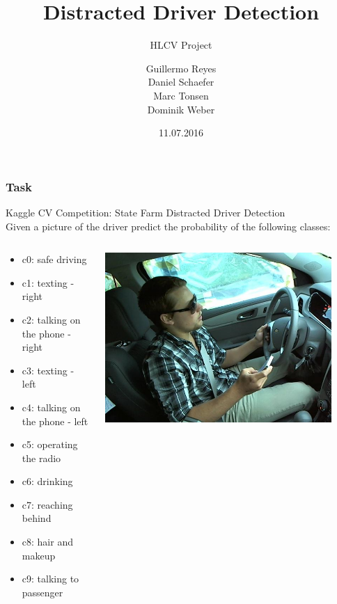 \documentclass{beamer}
\title{Distracted Driver Detection}
\subtitle{HLCV Project}
\author[Reyes, Schaefer, Tonsen, Weber]{Guillermo Reyes \\
	 Daniel Schaefer \\
	 Marc Tonsen \\
 Dominik Weber\\}
\institute[]{Saarland University}
\date{11.07.2016}
\begin{document}
	\begin{frame}
		\titlepage
	\end{frame}
	
	
	\begin{frame}
		\frametitle{Task}
		Kaggle CV Competition: State Farm Distracted Driver Detection \\
		Given a picture of the driver predict the probability of the following classes:
		
		\begin{columns}
			\begin{column}{0.5\textwidth}
				\begin{itemize}
					\item c0: safe driving
					\item c1: texting - right
					\item c2: talking on the phone - right
					\item c3: texting - left
					\item c4: talking on the phone - left
					\item c5: operating the radio
					\item c6: drinking
					\item c7: reaching behind
					\item c8: hair and makeup
					\item c9: talking to passenger			
				\end{itemize}
			\end{column}
			\begin{column}{0.5\textwidth}  %
				\begin{center}
					\includegraphics[width=0.9\textwidth]{img_6}
				\end{center}
			\end{column}
		\end{columns}
		
	\end{frame}
	
\end{document}
